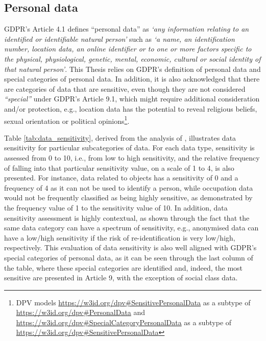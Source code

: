 \subsection{Personal data}
\label{sec:def_personal_data}

GDPR's Article 4.1 \citeyearpar{noauthor_regulation_2016} defines ``personal data'' as \textit{`any information relating to an identified or identifiable natural person'} such as \textit{`a name, an identification number, location data, an online identifier or to one or more factors specific to the physical, physiological, genetic, mental, economic, cultural or social identity of that natural person'}.
This Thesis relies on GDPR's definition of personal data and special categories of personal data.
In addition, it is also acknowledged that there are categories of data that are sensitive, even though they are not considered \textit{``special''} under GDPR's Article 9.1, which might require additional consideration and/or protection, e.g., location data has the potential to reveal religious beliefs, sexual orientation or political opinions\footnote{DPV models \url{https://w3id.org/dpv\#SensitivePersonalData} as a subtype of \url{https://w3id.org/dpv\#PersonalData} and \url{https://w3id.org/dpv\#SpecialCategoryPersonalData} as a subtype of \url{https://w3id.org/dpv\#SensitivePersonalData}}.

Table \ref{tab:data_sensitivity}, derived from the analysis of \cite{rumbold_what_2018}, illustrates data sensitivity for particular subcategories of data. For each data type, sensitivity is assessed from 0 to 10, i.e., from low to high sensitivity, and the relative frequency of falling into that particular sensitivity value, on a scale of 1 to 4, is also presented. For instance, data related to objects has a sensitivity of 0 and a frequency of 4 as it can not be used to identify a person, while occupation data would not be frequently classified as being highly sensitive, as demonstrated by the frequency value of 1 to the sensitivity value of 10.
In addition, data sensitivity assessment is highly contextual, as shown through the fact that the same data category can have a spectrum of sensitivity, e.g., anonymised data can have a low/high sensitivity if the risk of re-identification is very low/high, respectively. 
This evaluation of data sensitivity is also well aligned with GDPR's special categories of personal data, as it can be seen through the last column of the table, where these special categories are identified and, indeed, the most sensitive are presented in Article 9, with the exception of social class data.

